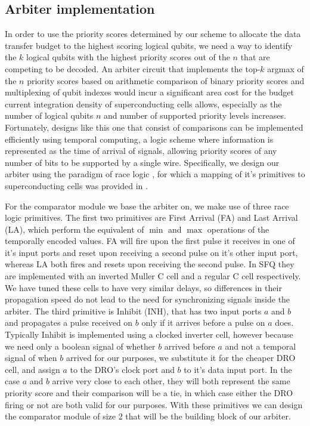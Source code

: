 \documentclass[conference]{IEEEtran}
\begin{document}
\subsection{Arbiter implementation}

In order to use the priority scores determined by our scheme to allocate the data transfer budget to the highest scoring logical qubits, we need a way to identify the $k$ logical qubits with the highest priority scores out of the $n$ that are competing to be decoded.
An arbiter circuit that implements the top-$k$ argmax of the $n$ priority scores based on arithmetic comparison of binary priority scores and multiplexing of qubit indexes would incur a significant area cost for the budget current integration density of superconducting cells allows, especially as the number of logical qubits $n$ and number of supported priority levels increases.
Fortunately, designs like this one that consist of comparisons can be implemented efficiently using temporal computing, a logic scheme where information is represented as the time of arrival of signals, allowing priority scores of any number of bits to be supported by a single wire. 
Specifically, we design our arbiter using the paradigm of race logic \cite{racelogic}, for which a mapping of it's primitives to superconducting cells was provided in \cite{sfq_race}.

For the comparator module we base the arbiter on, we make use of three race logic primitives.
The first two primitives are First Arrival (FA) and Last Arrival (LA), which perform the equivalent of $\min$ and $\max$ operations of the temporally encoded values.
FA will fire upon the first pulse it receives in one of it's input ports and reset upon receiving a second pulse on it's other input port, whereas LA both fires and resets upon receiving the second pulse.
In SFQ they are implemented with an inverted Muller C cell and a regular C cell respectively.
We have tuned these cells to have very similar delays, so differences in their propagation speed do not lead to the need for synchronizing signals inside the arbiter.
The third primitive is Inhibit (INH), that has two input ports $a$ and $b$ and propagates a pulse received on $b$ only if it arrives before a pulse on $a$ does.
Typically Inhibit is implemented using a clocked inverter cell, however because we need only a boolean signal of whether $b$ arrived before $a$ and not a temporal signal of when $b$ arrived for our purposes, we substitute it for the cheaper DRO cell, and assign $a$ to the DRO's clock port and $b$ to it's data input port.
In the case $a$ and $b$ arrive very close to each other, they will both represent the same priority score and their comparison will be a tie, in which case either the DRO firing or not are both valid for our purposes.
With these primitives we can design the comparator module of size 2 that will be the building block of our arbiter.
\end{document}

